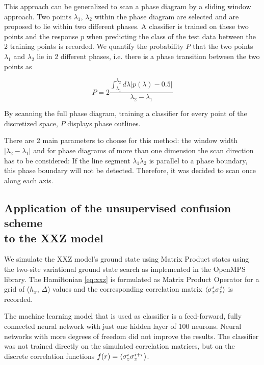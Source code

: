 \documentclass[prl, reprint, twocolumn]{revtex4-1}
\begin{document}
	This approach can be generalized to scan a phase diagram by a sliding window approach\cite{Broecker2017}. Two points $\lambda_1$, $\lambda_2$ within the phase diagram are selected and are proposed to lie within two different phases. A classifier is trained on these two points and the response $p$ when predicting the class of the test data between the 2 training points is recorded. We quantify the probability $P$ that the two points $\lambda_1$ and $\lambda_2$ lie in 2 different phases, i.e. there is a phase transition between the two points as
	
	\begin{equation}
	P = 2\frac{\int_{\lambda_1}^{\lambda_2} d\lambda |p(\lambda) - 0.5|}{\lambda_2-\lambda_1}
	\label{eq:P}
	\end{equation}
	
	By scanning the full phase diagram, training a classifier for every point of the discretized space, $P$ displays phase outlines.
	
	There are 2 main parameters to choose for this method: the window width $|\lambda_2-\lambda_1|$ and for phase diagrams of more than one dimension the scan direction has to be considered: If the line segment $\overline{\lambda_1\lambda_2}$ is parallel to a phase boundary, this phase boundary will not be detected.
	Therefore, it was decided to scan once along each axis.
	
	
	
	\subsection{Application of the unsupervised confusion scheme \\ to the XXZ model}
	We simulate the XXZ model's ground state using Matrix Product states\cite{Schollwoeck2011} using the two-site variational ground state search as implemented in the OpenMPS library\cite{Jaschke2018, Wall2012}. The Hamiltonian \ref{eq:xxz} is formulated as Matrix Product Operator for a grid of ($h_x$, $\Delta$) values and the corresponding correlation matrix $\braket{\sigma^i_z\sigma^j_z}$ is recorded.
	
	The machine learning model that is used as classifier is a feed-forward, fully connected neural network with just one hidden layer of 100 neurons. Neural networks with more degrees of freedom did not improve the results. The classifier was not trained directly on the simulated correlation matrices, but on the discrete correlation functions $f(r) = \braket{\sigma^i_z\sigma^{i+r}_z}$.
	
\end{document}
